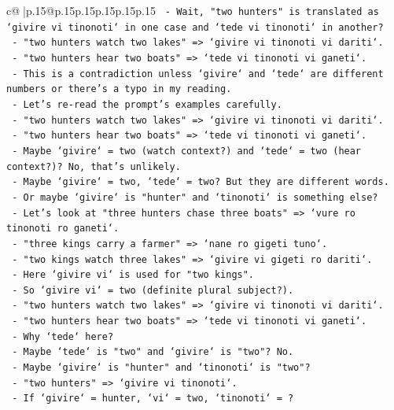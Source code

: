 \documentclass{article}
\begin{document}
{\begin{supertabular}{c@{$\;$}|p{.15\linewidth}@{}p{.15\linewidth}p{.15\linewidth}p{.15\linewidth}p{.15\linewidth}p{.15\linewidth}}
{{{\texttt{  {-} Wait, "two hunters" is translated as `givire vi tinonoti` in one case and `tede vi tinonoti` in another?} \\
\texttt{  {-} "two hunters watch two lakes" => `givire vi tinonoti vi dariti`.} \\
\texttt{  {-} "two hunters hear two boats" => `tede vi tinonoti vi ganeti`.} \\
\texttt{  {-} This is a contradiction unless `givire` and `tede` are different numbers or there's a typo in my reading.} \\
\texttt{  {-} Let's re{-}read the prompt's examples carefully.} \\
\texttt{  {-} "two hunters watch two lakes" => `givire vi tinonoti vi dariti`.} \\
\texttt{  {-} "two hunters hear two boats" => `tede vi tinonoti vi ganeti`.} \\
\texttt{  {-} Maybe `givire` = two (watch context?) and `tede` = two (hear context?)? No, that's unlikely.} \\
\texttt{  {-} Maybe `givire` = two, `tede` = two? But they are different words.} \\
\texttt{  {-} Or maybe `givire` is "hunter" and `tinonoti` is something else?} \\
\texttt{  {-} Let's look at "three hunters chase three boats" => `vure ro tinonoti ro ganeti`.} \\
\texttt{  {-} "three kings carry a farmer" => `nane ro gigeti tuno`.} \\
\texttt{  {-} "two kings watch three lakes" => `givire vi gigeti ro dariti`.} \\
\texttt{  {-} Here `givire vi` is used for "two kings".} \\
\texttt{  {-} So `givire vi` = two (definite plural subject?).} \\
\texttt{  {-} "two hunters watch two lakes" => `givire vi tinonoti vi dariti`.} \\
\texttt{  {-} "two hunters hear two boats" => `tede vi tinonoti vi ganeti`.} \\
\texttt{  {-} Why `tede` here?} \\
\texttt{  {-} Maybe `tede` is "two" and `givire` is "two"? No.} \\
\texttt{  {-} Maybe `givire` is "hunter" and `tinonoti` is "two"?} \\
\texttt{  {-} "two hunters" => `givire vi tinonoti`.} \\
\texttt{  {-} If `givire` = hunter, `vi` = two, `tinonoti` = ?} \\
}}}
\end{supertabular}}
\end{document}
